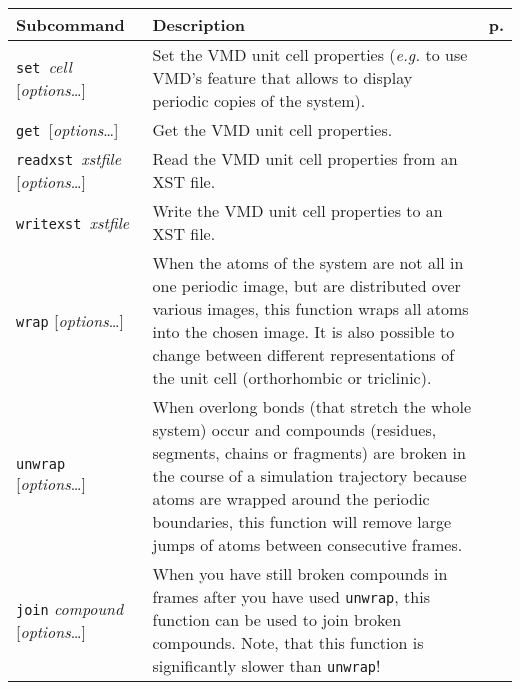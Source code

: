 \documentclass[a4paper, DIV12]{scrartcl}
\newcommand{\eg}{\emph{e.g.}\xspace}
\begin{document}
\begin{table}[p]
  \centering
  \begin{tabular}{|p{}|p{}|r|}
    \hline
    \textbf{Subcommand} & \textbf{Description} & \textbf{p.}\\\hline\hline
    
    \mbox{\texttt{set} \textit{cell}} [\textit{options}\dots]
    & Set the VMD unit cell properties (\eg to use VMD's feature that
    allows to display periodic copies of the system). 
    & \pageref{sec:set}
    \\\hline
  
    \mbox{\texttt{get} [\textit{options}\dots]}
    & Get the VMD unit cell properties. 
    & \pageref{sec:get}
    \\\hline

    \mbox{\texttt{readxst} \textit{xstfile}} [\textit{options}\dots]
    & Read the VMD unit cell properties from an XST file.
    & \pageref{sec:readxst} 
    \\\hline

    \mbox{\texttt{writexst} \textit{xstfile}}
    & Write the VMD unit cell properties to an XST file.
    & \pageref{sec:writexst} 
    \\\hline
  
    \texttt{wrap} [\textit{options}\dots]
    & When the atoms of the system are not all in one periodic image,
    but are distributed over various images, this function wraps all
    atoms into the chosen image. It is also possible to change between
    different representations of the unit cell (orthorhombic or triclinic).
    & \pageref{sec:wrap}
    \\\hline
  
    \texttt{unwrap} [\textit{options}\dots]
    & When overlong bonds (that stretch the whole system) occur and
    compounds (residues, segments, chains or fragments) are broken in
    the course of a simulation trajectory because atoms are wrapped
    around the periodic boundaries, this function will remove large
    jumps of atoms between consecutive frames.
    & \pageref{sec:unwrap}
    \\\hline
  
    \texttt{join} \textit{compound} [\textit{options}\dots]
    & When you have still broken compounds in frames after you have
    used \texttt{unwrap}, this function can be used to join broken
    compounds. Note, that this function is significantly slower than
    \texttt{unwrap}!
    & \pageref{sec:join}
    \\\hline
  

\end{tabular}
\end{table}
\end{document}
